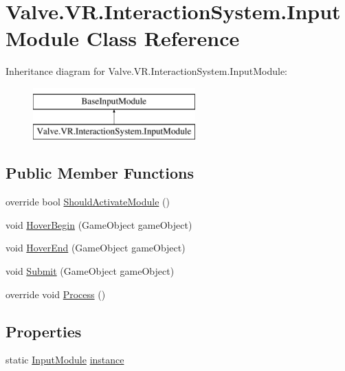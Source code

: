 \hypertarget{class_valve_1_1_v_r_1_1_interaction_system_1_1_input_module}{}\section{Valve.\+V\+R.\+Interaction\+System.\+Input\+Module Class Reference}
\label{class_valve_1_1_v_r_1_1_interaction_system_1_1_input_module}
Inheritance diagram for Valve.\+V\+R.\+Interaction\+System.\+Input\+Module\+:\begin{figure}[H]
\begin{center}
\leavevmode
\includegraphics[height=2.000000cm]{class_valve_1_1_v_r_1_1_interaction_system_1_1_input_module}
\end{center}
\end{figure}
\subsection*{Public Member Functions}
\begin{DoxyCompactItemize}
\item 
override bool \mbox{\hyperlink{class_valve_1_1_v_r_1_1_interaction_system_1_1_input_module_a75ba53d0ffe7f688b8d8440fc60eb643}{Should\+Activate\+Module}} ()
\item 
void \mbox{\hyperlink{class_valve_1_1_v_r_1_1_interaction_system_1_1_input_module_a516437e1ea7801b815b59a5bda77bd0e}{Hover\+Begin}} (Game\+Object game\+Object)
\item 
void \mbox{\hyperlink{class_valve_1_1_v_r_1_1_interaction_system_1_1_input_module_a0a8f8a7133b5e1d79fcd9687d48ce42d}{Hover\+End}} (Game\+Object game\+Object)
\item 
void \mbox{\hyperlink{class_valve_1_1_v_r_1_1_interaction_system_1_1_input_module_a856a142789e32f5e1b88c2cbd11bf392}{Submit}} (Game\+Object game\+Object)
\item 
override void \mbox{\hyperlink{class_valve_1_1_v_r_1_1_interaction_system_1_1_input_module_a56f73fde60678221c23371ea94a48401}{Process}} ()
\end{DoxyCompactItemize}
\subsection*{Properties}
\begin{DoxyCompactItemize}
\item 
static \mbox{\hyperlink{class_valve_1_1_v_r_1_1_interaction_system_1_1_input_module}{Input\+Module}} \mbox{\hyperlink{class_valve_1_1_v_r_1_1_interaction_system_1_1_input_module_a88f1603f8015d72a04672539920fbcbf}{instance}}
\end{DoxyCompactItemize}


